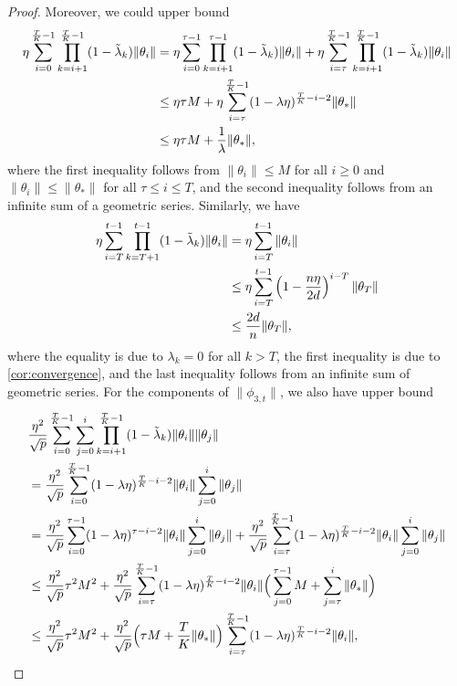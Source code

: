 \begin{proof}
    Moreover, we could upper bound
    \begin{align*}
        \eta\sum_{i=0}^{\frac{T}{K}-1}\prod_{k=i+1}^{\frac{T}{K}-1}(1-\tilde{\lambda}_k) \|\theta_i\| & = \eta\sum_{i=0}^{\tau-1}\prod_{k=i+1}^{\tau-1}(1-\tilde{\lambda}_k) \|\theta_i\| + \eta\sum_{i=\tau}^{\frac{T}{K}-1}\prod_{k=i+1}^{\frac{T}{K}-1}(1-\tilde{\lambda}_k) \|\theta_i\| \\
        & \leq \eta\tau M + \eta\sum_{i=\tau}^{\frac{T}{K}-1}(1 - \lambda\eta)^{\frac{T}{K}-i-2} \|\theta_*\| \\
        & \leq \eta\tau M + \frac{1}{\lambda} \|\theta_*\|,
    \end{align*}
    where the first inequality follows from $\|\theta_i\|\leq M$ for all $i\geq 0$ and $\|\theta_i\|\leq \|\theta_*\|$ for all $\tau\leq i\leq T$, and the second inequality follows from an infinite sum of a geometric series. Similarly, we have
    \begin{align*}
        \eta\sum_{i=T}^{t-1} \prod_{k=T+1}^{t-1}(1-\tilde{\lambda}_k) \|\theta_i\| & = \eta\sum_{i=T}^{t-1} \|\theta_i\| \\
        & \leq \eta \sum_{i=T}^{t-1} \left( 1-\frac{n\eta}{2d} \right)^{i-T} \|\theta_T\| \\
        & \leq \frac{2d}{n} \|\theta_T\|,
    \end{align*}
    where the equality is due to $\lambda_k = 0$ for all $k > T$, the first inequality is due to \cref{cor:convergence}, and the last inequality follows from an infinite sum of geometric series. For the components of $\|\phi_{3,t}\|$, we also have upper bound 
    \begin{align*}
        & \frac{\eta^2}{\sqrt p}\sum_{i=0}^{\frac{T}{K}-1}\sum_{j=0}^i\prod_{k=i+1}^{\frac{T}{K}-1}(1-\tlam_k) \|\theta_i\|\|\theta_j\| \\
        & = \frac{\eta^2}{\sqrt p}\sum_{i=0}^{\frac{T}{K}-1}(1 - \lambda\eta)^{\frac{T}{K}-i-2} \|\theta_i\| \sum_{j=0}^i \|\theta_j\| \\
        & = \frac{\eta^2}{\sqrt p}\sum_{i=0}^{\tau-1}(1 - \lambda\eta)^{\tau-i-2} \|\theta_i\| \sum_{j=0}^i \|\theta_j\| + \frac{\eta^2}{\sqrt p}\sum_{i=\tau}^{\frac{T}{K}-1}(1 - \lambda\eta)^{\frac{T}{K}-i-2} \|\theta_i\| \sum_{j=0}^i \|\theta_j\| \\
        & \leq \frac{\eta^2}{\sqrt p} \tau^2 M^2 + \frac{\eta^2}{\sqrt p}\sum_{i=\tau}^{\frac{T}{K}-1}(1 - \lambda\eta)^{\frac{T}{K}-i-2} \|\theta_i\| \Big( \sum_{j=0}^{\tau-1} M + \sum_{j=\tau}^{i} \|\theta_*\| \Big) \\
        & \leq \frac{\eta^2}{\sqrt p} \tau^2 M^2 + \frac{\eta^2}{\sqrt p} \Big( \tau M + \frac{T}{K} \|\theta_*\| \Big) \sum_{i=\tau}^{\frac{T}{K}-1}(1 - \lambda\eta)^{\frac{T}{K}-i-2} \|\theta_i\|,

\end{align*}
\end{proof}
